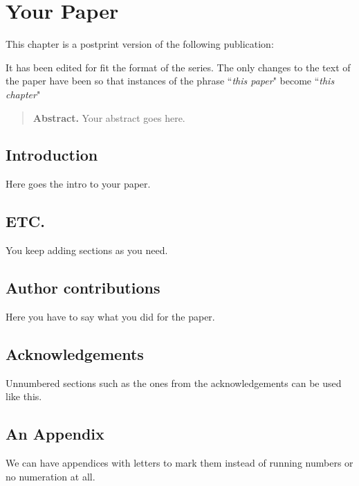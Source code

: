 

\chapter{Your Paper}

This chapter is a postprint version of the following publication:

\begin{quote}
\end{quote}

\noindent
It has been edited for fit the format of the \DataLinguistica series.
The only changes to the text of the paper have been so that instances of the phrase ``\textit{this paper}" become ``\textit{this chapter}"
\\

\begin{quote}
\textbf{Abstract.}
Your abstract goes here.
\end{quote}

\section{Introduction}
Here goes the intro to your paper.

\section{ETC.}
You keep adding sections as you need.

\section*{Author contributions}
Here you have to say what you did for the paper.

\section*{Acknowledgements}
Unnumbered sections such as the ones from the acknowledgements can be used like this.

\begin{subappendices}

\section{An Appendix}
We can have appendices with letters to mark them instead of running numbers or no numeration at all.

    
\end{subappendices}
